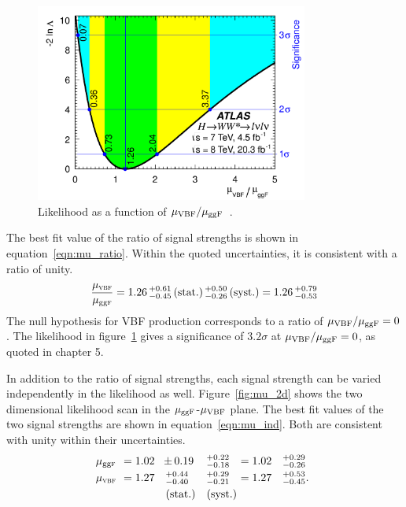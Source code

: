 \begin{figure}[h!]
  \centering
  \captionsetup{justification=centering}

  \includegraphics[width=0.8\textwidth]{figures/WW_muratio}
  \caption{Likelihood as a function of $\mu_{{\rm VBF}}/\mu_{{\rm ggF}}$~\cite{WW2015}.}
  \label{fig:mu_ratio}
\end{figure}

The best fit value of the ratio of signal strengths is shown in equation~\ref{eqn:mu_ratio}. Within the quoted uncertainties, it is consistent with a ratio of unity. 
%
\begin{equation}
  \frac{\mu_{{\textsc{\scriptsize vbf}}}}{\mu_{{\tiny\rm gg}{\textsc{\scriptsize f}}}} 
  = 1.26\,^{+0.61}_{-0.45}\,(\rm{stat.})\,^{+0.50}_{-0.26}\,(\rm{syst.})
  = 1.26\,^{+0.79}_{-0.53} 
\label{eqn:mu_ratio}
\end{equation}
%
The null hypothesis for VBF production corresponds to a ratio of $\mu_{{\rm VBF}}/\mu_{{\rm ggF}} = 0$. The likelihood in figure~\ref{fig:mu_ratio} gives a significance of $3.2\sigma$ at $\mu_{{\rm VBF}}/\mu_{{\rm ggF}} = 0$, as quoted in chapter 5. 

In addition to the ratio of signal strengths, each signal strength can be varied independently in the likelihood as well. Figure~\ref{fig:mu_2d} shows the two dimensional likelihood scan in the $\mu_{{\rm ggF}}$-$\mu_{{\rm VBF}}$ plane. The best fit values of the two signal strengths are shown in equation~\ref{eqn:mu_ind}. Both are consistent with unity within their uncertainties.
%
\begin{equation}
\begin{array}{llllll}
\no\mu_{\scggF}\no&=1.02\no&{\PM}0.19           \np&^{+0.22}_{-0.18}\np&=1.02&^{+0.29}_{-0.26} \\ \clineskip
\no\mu_{\scVX} \no&=1.27\no&\,\,^{+0.44}_{-0.40}\np&^{+0.29}_{-0.21}\np&=1.27&^{+0.53}_{-0.45}.\\ \clineskip
                     &        & ~\textrm{(stat.)}     &\textrm{(syst.)}\np
\end{array}
\label{eqn:mu_ind}
\end{equation}

